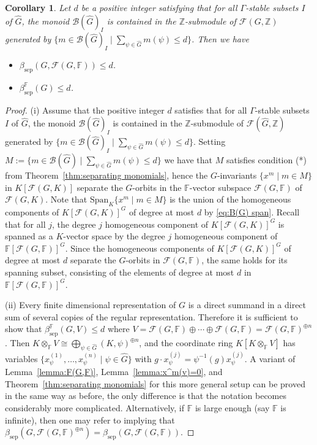 \documentclass[12pt, oneside]{amsart}
\newtheorem{corollary}[theorem]{\bf Corollary}
\def\field{K}
\def\ZZ{\mathbb{Z}}
\def\FF{\mathbb{F}}
\def\sepbeta{\beta_{\mathrm{sep}}}
\begin{document}
\begin{corollary} \label{cor:sepnoether}
Let $d$ be a positive integer satisfying that 
for all $\Gamma$-stable subsets $I$ of $\widehat G$, 
the monoid $\mathcal{B}(\widehat G)_I$ is contained in the $\ZZ$-submodule of 
$\mathcal{F}(G,\ZZ)$ generated by 
$\{m\in\mathcal{B}(\widehat G)_I\mid \sum_{\psi\in\widehat G}m(\psi)\le d\}$. 
Then we have 
\begin{itemize}
\item[(i)]  $\sepbeta(G,\mathcal{F}(G,\FF))\le d$. 
\item[(ii)] $\sepbeta^\FF(G)\le d$. 
\end{itemize} 
\end{corollary} 

\begin{proof} 
(i) Assume that the positive integer $d$ satisfies that for all $\Gamma$-stable subsets $I$ of $\widehat G$, 
the monoid $\mathcal{B}(\widehat G)_I$ is contained in the $\ZZ$-submodule of 
$\mathcal{F}(\widehat G,\ZZ)$ generated by 
$\{m\in\mathcal{B}(\widehat G)_I\mid \sum_{\psi\in\widehat G}m(\psi)\le d\}$. 
Setting $M:=\{m\in \mathcal{B}(\widehat G)\mid \sum_{\psi\in\widehat G}m(\psi)\le d\}$ we have 
that $M$ satisfies condition (*) from Theorem~\ref{thm:separating monomials}, 
hence the $G$-invariants 
$\{x^m\mid m\in M\}$ in $\field[\mathcal{F}(G,\field)]$ 
separate the $G$-orbits in the $\FF$-vector subspace 
$\mathcal{F}(G,\FF)$ of $\mathcal{F}(G,\field)$. 
Note that  $\mathrm{Span}_\field\{x^m\mid m\in M\}$ is 
the union of the homogeneous components of $\field[\mathcal{F}(G,\field)]^G$ of degree at most $d$ by 
\eqref{eq:B(G) span}. Recall that for all $j$, the degree $j$ homogeneous component of  $\field[\mathcal{F}(G,\field)]^G$ 
is spanned as a $\field$-vector space by the degree $j$ homogeneous component of $\FF[\mathcal{F}(G,\FF)]^G$. 
Since the homogeneous components of $\field[\mathcal{F}(G,\field)]^G$  of degree at most $d$ separate the $G$-orbits in 
$\mathcal{F}(G,\FF)$, the same holds for its spanning subset, consisting of the  elements of degree at most $d$ in  $\FF[\mathcal{F}(G,\FF)]^G$. 

(ii) Every finite dimensional representation of $G$  is a direct summand in a direct sum of several copies of the 
regular representation. Therefore it is sufficient to show that 
$\sepbeta^\FF(G,V)\le d$ where 
$V=\mathcal{F}(G,\FF)\oplus \cdots\oplus \mathcal{F}(G,\FF)=\mathcal{F}(G,\FF)^{\oplus n}$. 
Then $\field\otimes_\FF V\cong \bigoplus_{\psi\in\widehat G}(\field,\psi)^{\oplus n}$, 
and the coordinate ring $\field[\field\otimes_\FF V]$ has variables 
$\{x_\psi^{(1)},\dots,x_\psi^{(n)}\mid \psi\in\widehat G\}$ with 
$g\cdot  x_\psi^{(j)}=\psi^{-1}(g)x_\psi^{(j)}$. 
A variant of Lemma~\ref{lemma:F(G,F)}, Lemma~\ref{lemma:x^m(v)=0},  
and Theorem~\ref{thm:separating monomials} for this more general setup 
can be proved in the same way as before, the only difference is that 
the notation becomes considerably more complicated. 
Alternatively, if $\FF$ is large enough (say $\FF$ is infinite), 
then one may refer to \cite[Theorem 3.4 (ii)]{draisma-kemper-wehlau} implying that 
$\sepbeta(G,\mathcal{F}(G,\FF)^{\oplus n})=\sepbeta(G,\mathcal{F}(G,\FF))$. 
\end{proof} 
\end{document}
